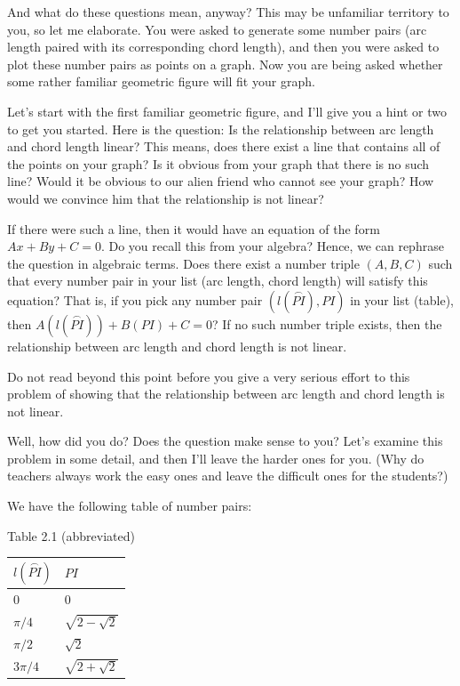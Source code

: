 \documentclass[english]{book}
\newcommand{\arc}[1]{\overset{\frown}{#1} }
\begin{document}
And what do these questions mean, anyway? This may be unfamiliar territory to you, so let me elaborate. You were asked to generate some number pairs (arc length paired with its corresponding chord length), and then you were asked to plot these number pairs as points on a graph. Now you are being asked whether some rather familiar geometric figure will fit your graph.

Let's start with the first familiar geometric figure, and I'll give you a hint or two to get you started. Here is the question: Is the relationship between arc length and chord length linear? This means, does there exist a line that contains all of the points on your graph? Is it obvious from your graph that there is no such line? Would it be obvious to our alien friend who cannot see your graph? How would we convince him that the relationship is not linear?

If there were such a line, then it would have an equation of the form $Ax + By + C = 0$. Do you recall this from your algebra? Hence, we can rephrase the question in algebraic terms. Does there exist a number triple $(A,B,C)$ such that every number pair in your list (arc length, chord length) will satisfy this equation? That is, if you pick any number pair $(l(\arc{PI}),PI)$ in your list (table), then $A(l(\arc{PI})) + B(PI) + C = 0$? If no such number triple exists, then the relationship between arc length and chord length is not linear.

Do not read beyond this point before you give a very serious effort to this problem of showing that the relationship between arc length and chord length is not linear.

Well, how did you do? Does the question make sense to you? Let's examine this problem in some detail, and then I'll leave the harder ones for you. (Why do teachers always work the easy ones and leave the difficult ones for the students?) 

We have the following table of number pairs:

\begin{center}
Table 2.1 (abbreviated)
\end{center}
\begin{table}[htbp]
\begin{center}
\begin{tabular}{|l|l|}
  \hline 
  $l(\arc{PI})$ & $PI$ \\
  \hline 
  0             & 0 \\
  $\pi/4$       & $\sqrt{2-\sqrt{2}}$ \\
  $\pi/2$       & $\sqrt{2}$ \\
  $3\pi/4$      & $\sqrt{2+\sqrt{2}}$ \\
  \hline
\end{tabular}
\label{tbl-q2.6}
\end{center}
\end{table}
\end{document}
